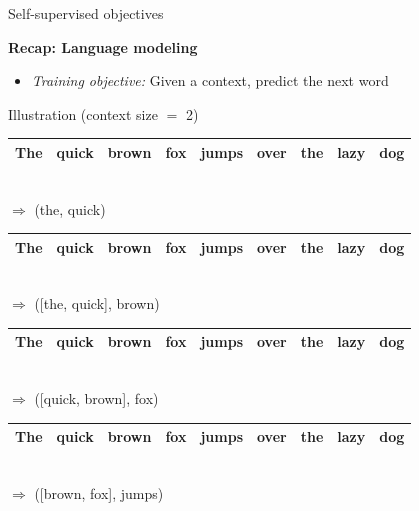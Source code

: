 \begin{frame}{Self-supervised objectives}

\vfill

\textbf{Recap: Language modeling}
	
	\begin{itemize}
		\item \textit{Training objective:} Given a context, predict the next word
	\end{itemize}
	
\begin{block}{Illustration (context size $=$ 2)}
\begin{tabular}{|c|c|c|cccccc|}
\hline
\cellcolor{blue!15}The & \cellcolor{blue!65}quick & brown & fox & jumps & over & the & lazy & dog \\
\hline
\end{tabular}\\
$\Rightarrow$ \quad (the, quick)
\begin{tabular}{|c|c|c|c|ccccc|}
\hline
\cellcolor{blue!15}The & \cellcolor{blue!15}quick & \cellcolor{blue!65}brown & fox & jumps & over & the & lazy & dog \\
\hline
\end{tabular}\\
$\Rightarrow$ \quad ([the, quick], brown)
\begin{tabular}{|c|c|c|c|ccccc|}
\hline
The & \cellcolor{blue!15}quick & \cellcolor{blue!15}brown & \cellcolor{blue!65}fox & jumps & over & the & lazy & dog \\
\hline
\end{tabular}\\
$\Rightarrow$ \quad ([quick, brown], fox)
\begin{tabular}{|c|c|c|c|ccccc|}
\hline
The & quick & \cellcolor{blue!15}brown & \cellcolor{blue!15}fox & \cellcolor{blue!65}jumps & over & the & lazy & dog \\
\hline
\end{tabular}\\
$\Rightarrow$ \quad ([brown, fox], jumps)
\end{block}
	
\vfill

\end{frame}


